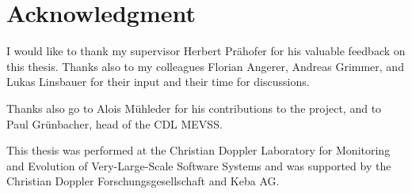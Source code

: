 \chapter*{Acknowledgment}

I would like to thank my supervisor Herbert Prähofer for his valuable feedback on this thesis. Thanks also to my 
colleagues Florian Angerer, Andreas Grimmer, and Lukas Linsbauer for their input and their time for discussions.

Thanks also go to Alois Mühleder for his contributions to the project, and to Paul Grünbacher, head of the CDL MEVSS.

This thesis was performed at the Christian Doppler Laboratory for Monitoring and Evolution of Very-Large-Scale Software 
Systems and was supported by the Christian Doppler \foreignlanguage{ngerman}{Forschungsgesellschaft} and Keba AG.
